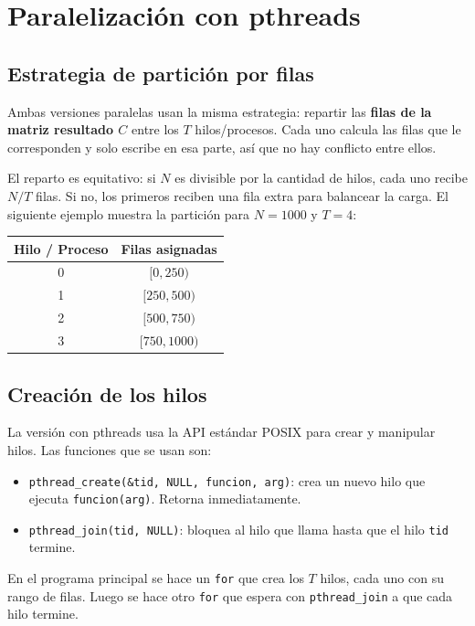\section{Paralelización con pthreads}

\subsection{Estrategia de partición por filas}

Ambas versiones paralelas usan la misma estrategia: repartir las \textbf{filas de la matriz resultado $C$} entre los $T$ hilos/procesos. Cada uno calcula las filas que le corresponden y solo escribe en esa parte, así que no hay conflicto entre ellos.

El reparto es equitativo: si $N$ es divisible por la cantidad de hilos, cada uno recibe $N/T$ filas. Si no, los primeros reciben una fila extra para balancear la carga. El siguiente ejemplo muestra la partición para $N = 1000$ y $T = 4$:

\begin{center}
\begin{tabular}{|c|c|}
\hline
\textbf{Hilo / Proceso} & \textbf{Filas asignadas} \\
\hline
0 & $[0, 250)$ \\
1 & $[250, 500)$ \\
2 & $[500, 750)$ \\
3 & $[750, 1000)$ \\
\hline
\end{tabular}
\end{center}

\subsection{Creación de los hilos}

La versión con pthreads usa la API estándar POSIX para crear y manipular hilos. Las funciones que se usan son:

\begin{itemize}
    \item \texttt{pthread\_create(\&tid, NULL, funcion, arg)}: crea un nuevo hilo que ejecuta \texttt{funcion(arg)}. Retorna inmediatamente.
    \item \texttt{pthread\_join(tid, NULL)}: bloquea al hilo que llama hasta que el hilo \texttt{tid} termine.
\end{itemize}

En el programa principal se hace un \texttt{for} que crea los $T$ hilos, cada uno con su rango de filas. Luego se hace otro \texttt{for} que espera con \texttt{pthread\_join} a que cada hilo termine.

